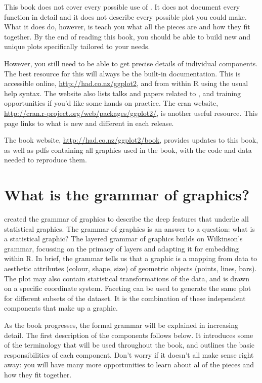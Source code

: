 This book does not cover every possible use of \ggplot. It does not document every function in detail and it does not describe every possible plot you could make. What it does do, however, is teach you what all the pieces are and how they fit together. By the end of reading this book, you should be able to build new and unique plots specifically tailored to your needs.

However, you still need to be able to get precise details of individual components. The best resource for this will always be the built-in documentation. This is accessible online, \url{http://had.co.nz/ggplot2}, and from within R using the usual help syntax. The website also lists talks and papers related to \ggplot, and training opportunities if you'd like some hands on practice. The {\sc cran} website, \url{http://cran.r-project.org/web/packages/ggplot2/}, is another useful resource. This page links to what is new and different in each release.

The book website, \url{http://had.co.nz/ggplot2/book}, provides updates to this book, as well as pdfs containing all graphics used in the book, with the code and data needed to reproduce them.


\section{What is the grammar of graphics?}

\citet{wilkinson:2006} created the grammar of graphics to describe the deep features that underlie all statistical graphics.  The grammar of graphics is an answer to a question: what is a statistical graphic?  The layered grammar of graphics \citep{wickham:2007d} builds on Wilkinson's grammar, focussing on the primacy of layers and adapting it for embedding within R.  In brief, the grammar tells us that a graphic is a mapping from data to  aesthetic attributes (colour, shape, size) of geometric objects (points, lines, bars).  The plot may also contain statistical transformations of the data, and is drawn on a specific  coordinate system.  Faceting can be used to generate the same plot for different subsets of the dataset.  It is the combination of these independent components that make up a graphic.  

As the book progresses, the formal grammar will be explained in increasing detail. The first description of the components follows below. It introduces some of the terminology that will be used throughout the book, and outlines the basic responsibilities of each component.  Don't worry if it doesn't all make sense right away: you will have many more opportunities to learn about al of the pieces and how they fit together.

